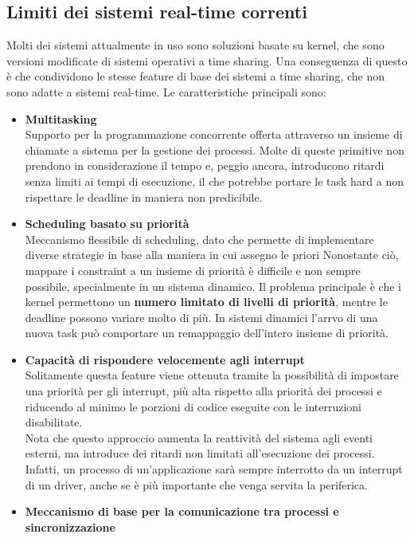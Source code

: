 \documentclass[12pt]{article}
\begin{document}
\subsection{Limiti dei sistemi real-time correnti}
Molti dei sistemi attualmente in uso sono soluzioni basate su kernel, che sono versioni modificate di sistemi operativi a time sharing.
Una conseguenza di questo è che condividono le stesse feature di base dei sistemi a time sharing, che non sono adatte a sistemi real-time.
Le caratteristiche principali sono:
\begin{itemize}
\item \textbf{Multitasking}\\
    Supporto per la programmazione concorrente offerta attraverso un insieme di chiamate a sistema per la gestione dei processi. Molte di queste primitive
    non prendono in considerazione il tempo e, peggio ancora, introducono ritardi senza limiti ai tempi di esecuzione, il che potrebbe portare le task hard a non rispettare le deadline in maniera non predicibile.
\item \textbf{Scheduling basato su priorità}\\
    Meccanismo flessibile di scheduling, dato che permette di implementare diverse strategie in base alla maniera in cui assegno le priori
    Nonostante ciò, mappare i constraint a un insieme di priorità è difficile e non sempre possibile, specialmente in un sistema dinamico.
    Il problema principale è che i kernel permettono un \textbf{numero limitato di livelli di priorità}, mentre le deadline possono variare molto di più.
    In sistemi dinamici l'arrvo di una nuova task può comportare un remappaggio dell'intero insieme di priorità.
\item \textbf{Capacità di rispondere velocemente agli interrupt}\\
    Solitamente questa feature viene ottenuta tramite la possibilità di impostare una priorità per gli interrupt, più alta rispetto alla priorità dei processi e 
    riducendo al minimo le porzioni di codice eseguite con le interruzioni disabilitate.
    \\
    Nota che questo approccio aumenta la reattività del sistema agli eventi esterni, ma introduce dei ritardi non limitati all'esecuzione dei processi.
    Infatti, un processo di un'applicazione sarà sempre interrotto da un interrupt di un driver, anche se è più importante che venga servita la periferica.
\item \textbf{Meccanismo di base per la comunicazione tra processi e sincronizzazione}\\

\end{itemize}
\end{document}
